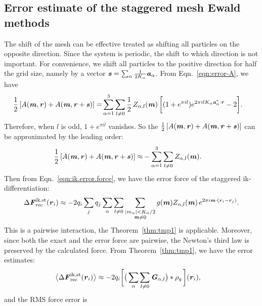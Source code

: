 \documentclass[aps,pre,preprint]{revtex4}
\renewcommand{\v}[1]{\textbf{\textit{#1}}}
\begin{document}
\subsection{Error estimate of the staggered mesh Ewald methods}

The shift of the mesh can be effective treated as shifting all
particles on the opposite direction. Since the system is periodic, the
shift to which direction is not important. For convenience, we shift
all particles to the positive direction for half the grid size, namely
by a vector $\v s = \sum_\alpha\frac1{2K_\alpha}\v a_\alpha$. From
Eqn.~\eqref{eqn:error-A}, we have
\begin{align}
  \frac12\, [A(\v m, \v r) + A(\v m, \v r+\v s)]
  =&
  \sum_{\alpha=1}^3\sum_{l\neq 0}
  \frac12\,
  Z_{\alpha,l}(\v m)\,
  \bigg[
  (1 + e^{\pi i l})e^{2\pi i l K_\alpha\v a^\ast_\alpha\cdot \v r} - 2
  \bigg].
\end{align}
Therefore, when $l$ is odd, $1 + e^{\pi i l}$ vanishes. So the $\frac12\,[A(\v
m, \v r) + A(\v m, \v r+\v s)]$ can be approximated by the leading
order:
\begin{align}
  \frac12\, [A(\v m, \v r) + A(\v m, \v r+\v s)]
  \approx&
  -\sum_{\alpha=1}^3\sum_{l\neq 0}
  Z_{\alpha,l}(\v m).
\end{align}
Then from Eqn.~\eqref{eqn:ik.error.force}, we have the error force of
the staggered ik-differentiation:
\begin{align}
  \Delta\v F^{\textrm{ik,st}}_{\textrm{rec}}(\v r_i)
  \approx -2q_i
  \sum_jq_j
  \sum_\alpha\sum_{l\neq 0}
  \sum_{
    \begin{subarray}{c}
      \vert m_{\alpha}\vert < K_\alpha/2\\
      \v m\neq 0
    \end{subarray}}
  g(\v m) Z_{\alpha,l}(\v m)\,e^{2\pi i\v m\cdot(\v r_i-\v r_j)}.
\end{align}
This is a pairwise interaction, the Theorem~\ref{thm:tmp1} is applicable.
Moreover, since both the exact and the error
force are pairwise,  the Newton's third law is preserved by the
calculated force.
From Theorem~\ref{thm:tmp1}, we have the error estimates:
\begin{align}\label{eqn:ik.st.meanf}
  \big\langle
  \Delta\v F_{\textrm{rec}}^{\textrm{ik,st}}(\v r_i)
  \big\rangle
  & \approx
  - 2 q_i
  \bigg[
  \big(
  \sum_{\alpha}\sum_{l\neq 0}\v G_{\alpha,l}
  \big)
  \ast\rho_q\,
  \bigg] (\v r_i),
\end{align}
and the RMS force error is 
\end{document}
